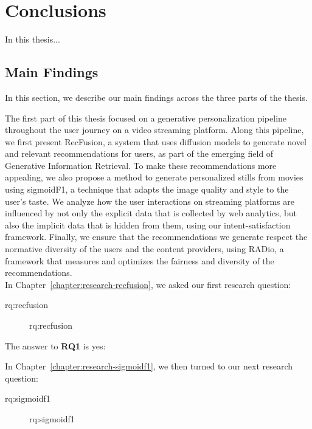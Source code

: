 
\chapter{Conclusions}
\label{chapter:conclusions}

\acresetall
In this thesis...


\section{Main Findings}
\label{section:conclusion-findings}
In this section, we describe our main findings across the three parts of the thesis. 

The first part of this thesis focused on a generative personalization pipeline throughout the user journey on a video streaming platform. Along this pipeline, we first present RecFusion, a system that uses diffusion models to generate novel and relevant recommendations for users, as part of the emerging field of Generative Information Retrieval. To make these recommendations more appealing, we also propose a method to generate personalized stills from movies using sigmoidF1, a technique that adapts the image quality and style to the user’s taste. We analyze how the user interactions on streaming platforms are influenced by not only the explicit data that is collected by web analytics, but also the implicit data that is hidden from them, using our intent-satisfaction framework. Finally, we ensure that the recommendations we generate respect the normative diversity of the users and the content providers, using RADio, a framework that measures and optimizes the fairness and diversity of the recommendations.\\

In Chapter~\ref{chapter:research-recfusion}, we asked our first research question:

\begin{description}\item[\acs{rq:recfusion}]\acl{rq:recfusion}\end{description}

\noindent
The answer to \textbf{RQ1} is yes: 

In Chapter~\ref{chapter:research-sigmoidf1}, we then turned to our next research question:

\begin{description}\item[\acs{rq:sigmoidf1}]\acl{rq:sigmoidf1}\end{description}

